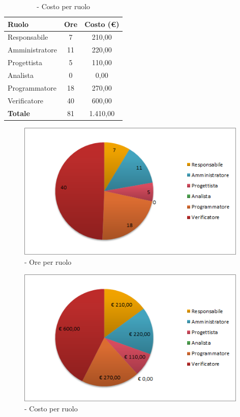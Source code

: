 \documentclass[../PianoDiProgetto.tex]{subfiles}
\begin{document}
	\begin{table}[H]
		\centering
	
		\begin{tabular}{l * {2}{c}}
			\toprule
			\textbf{Ruolo} & \textbf{Ore} & \textbf{Costo (\euro{})} \\
			\midrule
			Responsabile & 7 & 210,00 \\
			Amministratore  & 11 & 220,00 \\
			Progettista  & 5 & 110,00 \\
			Analista & 0 & 0,00 \\
			Programmatore  & 18 &  270,00 \\
			Verificatore  & 40 &  600,00 \\
			\midrule
			\textbf{Totale}  & 81   &  1.410,00 \\
			\bottomrule	
		\end{tabular}
		\caption{\PerV{} - Costo per ruolo}
	\end{table}
\vfill	
	
	\begin{figure}[H]
		\centering
		\includegraphics[width=11cm, trim=1cm 0cm 1cm 0cm]{grafici/V-ruolo}
			\caption{\PerV{} - Ore per ruolo}
	\end{figure}
\vfill	

	\begin{figure}[H]
		\centering
		\includegraphics[width=11cm, trim=1cm 0cm 1cm 0cm]{grafici/V-costo}
			\caption{\PerV{} - Costo per ruolo}
	\end{figure}	
	
\end{document}
